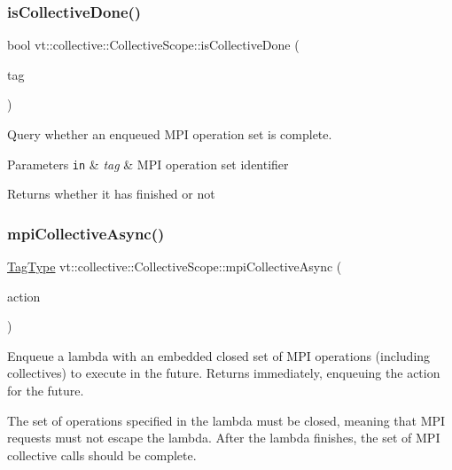 \subsubsection{\texorpdfstring{is\+Collective\+Done()}{isCollectiveDone()}}
{\footnotesize\ttfamily bool vt\+::collective\+::\+Collective\+Scope\+::is\+Collective\+Done (\begin{DoxyParamCaption}\item[{\hyperlink{namespacevt_a84ab281dae04a52a4b243d6bf62d0e52}{Tag\+Type}}]{tag }\end{DoxyParamCaption})}



Query whether an enqueued M\+PI operation set is complete. 


\begin{DoxyParams}[1]{Parameters}
\mbox{\tt in}  & {\em tag} & M\+PI operation set identifier\\
\hline
\end{DoxyParams}
\begin{DoxyReturn}{Returns}
whether it has finished or not 
\end{DoxyReturn}
\mbox{\label{structvt_1_1collective_1_1_collective_scope_ad116d0b00f28b79dbf7c4b0e5c4ed4a1}} 
\subsubsection{\texorpdfstring{mpi\+Collective\+Async()}{mpiCollectiveAsync()}}
{\footnotesize\ttfamily \hyperlink{namespacevt_a84ab281dae04a52a4b243d6bf62d0e52}{Tag\+Type} vt\+::collective\+::\+Collective\+Scope\+::mpi\+Collective\+Async (\begin{DoxyParamCaption}\item[{\hyperlink{namespacevt_ae0a5a7b18cc99d7b732cb4d44f46b0f3}{Action\+Type}}]{action }\end{DoxyParamCaption})}



Enqueue a lambda with an embedded closed set of M\+PI operations (including collectives) to execute in the future. Returns immediately, enqueuing the action for the future. 

The set of operations specified in the lambda must be closed, meaning that M\+PI requests must not escape the lambda. After the lambda finishes, the set of M\+PI collective calls should be complete.

